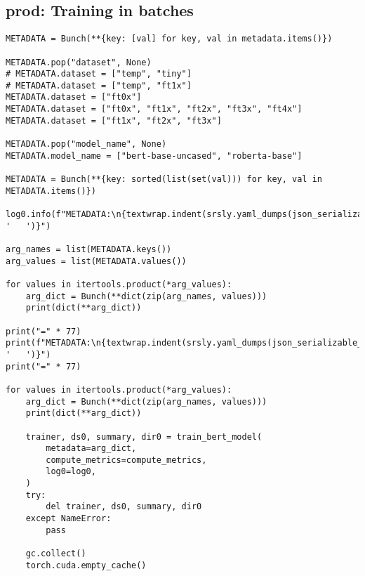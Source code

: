 \documentclass[a4paper,10pt,onecolumn,oneside,openright]{article}
\begin{document}
\subsection{prod: Training in batches}
\label{sec:org273f8de}
\begin{verbatim}
METADATA = Bunch(**{key: [val] for key, val in metadata.items()})

METADATA.pop("dataset", None)
# METADATA.dataset = ["temp", "tiny"]
# METADATA.dataset = ["temp", "ft1x"]
METADATA.dataset = ["ft0x"]
METADATA.dataset = ["ft0x", "ft1x", "ft2x", "ft3x", "ft4x"]
METADATA.dataset = ["ft1x", "ft2x", "ft3x"]

METADATA.pop("model_name", None)
METADATA.model_name = ["bert-base-uncased", "roberta-base"]

METADATA = Bunch(**{key: sorted(list(set(val))) for key, val in METADATA.items()})

log0.info(f"METADATA:\n{textwrap.indent(srsly.yaml_dumps(json_serializable_or_str_repr(dict(METADATA))), '   ')}")

arg_names = list(METADATA.keys())
arg_values = list(METADATA.values())

for values in itertools.product(*arg_values):
    arg_dict = Bunch(**dict(zip(arg_names, values)))
    print(dict(**arg_dict))

print("=" * 77)
print(f"METADATA:\n{textwrap.indent(srsly.yaml_dumps(json_serializable_or_str_repr(dict(METADATA))), '   ')}")
print("=" * 77)

for values in itertools.product(*arg_values):
    arg_dict = Bunch(**dict(zip(arg_names, values)))
    print(dict(**arg_dict))

    trainer, ds0, summary, dir0 = train_bert_model(
        metadata=arg_dict,
        compute_metrics=compute_metrics,
        log0=log0,
    )
    try:
        del trainer, ds0, summary, dir0
    except NameError:
        pass

    gc.collect()
    torch.cuda.empty_cache()

\end{verbatim}
\end{document}
